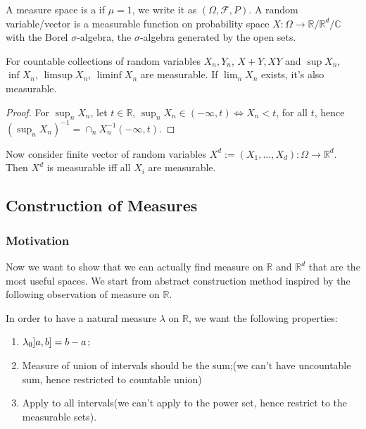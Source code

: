A measure space is a  if \(\mu =1\), we write it as \((\Omega, \mathcal{F}, P)\). A random variable/vector is a measurable function on probability space \(X: \Omega \to \mathbb{R}/\mathbb{R}^{d}/\mathbb{C}\) with the Borel \(\sigma\)-algebra, the \(\sigma\)-algebra generated by the open sets.

\begin{thm}[Measurability]
    For countable collections of random variables \(X_{n}, Y_{n}\), \(X +Y, XY\) and \(\sup X_{n}\), \( \inf X_{n}\), \( \limsup X_{n}\), \( \liminf X_{n}\) are measurable. If \(\lim_{n} X_{n}\) exists, it's also measurable.
\end{thm}

\begin{proof}
    For \(\sup_{n} X_{n}\), let \(t \in \mathbb{R}\), \(\sup_{n} X_{n} \in (-\infty, t) \iff X_{n} < t\), for all \(t\), hence \((\sup_{n} X_{n})^{-1} = \cap_{n} X_{n} ^{-1} (- \infty, t)\).    
\end{proof}
Now consider finite vector of random variables \(X^{d} := (X_{1}, \dots,X_{d}) : \Omega \to \mathbb{R}^{d}\). Then \(X^{d}\) is measurable iff all \(X_{i}\) are measurable. 

\subsection{Construction of Measures}

\subsubsection{Motivation}
Now we want to show that we can actually find measure on \(\mathbb{R}\) and \(\mathbb{R}^{d}\) that are the most useful spaces. We start from abstract construction method inspired by the following observation of measure on \(\mathbb{R}\).

In order to have a natural measure \(\lambda\) on \(\mathbb{R}\), we want the following properties:
\begin{enumerate}
    \item \(\lambda_{0} \linterval{a}{b} = b - a \);
    \item Measure of union of intervals should be the sum;(we can't have uncountable sum, hence restricted to countable union)
    \item Apply to all intervals(we can't apply to the power set, hence restrict to the measurable sets).
\end{enumerate}

